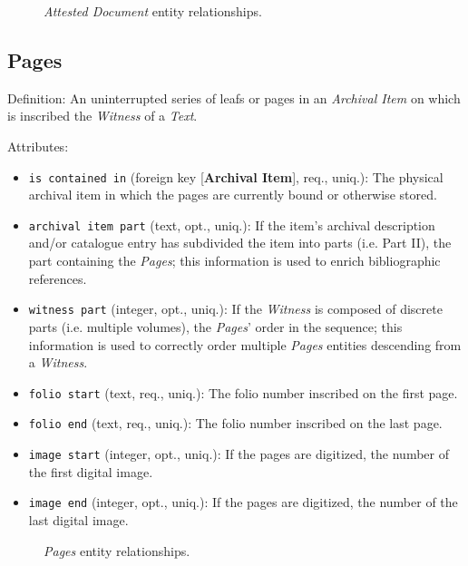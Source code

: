 \begin{figure}[ht]
    \begin{center}
        
    \end{center}
\label{fig:AttestedDocumentER}
\caption{\textit{Attested Document} entity relationships.}
\end{figure}


\subsection{Pages}

Definition: An uninterrupted series of leafs or pages in an \textit{Archival Item} on which is inscribed the \textit{Witness} of a \textit{Text}.

\vspace{1em}
\noindent Attributes:
\begin{itemize}
    \item \texttt{is contained in} (foreign key [\textbf{Archival Item}], req., uniq.): The physical archival item in which the pages are currently bound or otherwise stored.
    \item \texttt{archival item part} (text, opt., uniq.): If the item's archival description and/or catalogue entry has subdivided the item into parts (i.e. Part II), the part containing the \textit{Pages}; this information is used to enrich bibliographic references.
    \item \texttt{witness part} (integer, opt., uniq.): If the \textit{Witness} is composed of discrete parts (i.e. multiple volumes), the \textit{Pages}' order in the sequence; this information is used to correctly order multiple \textit{Pages} entities descending from a \textit{Witness}.
    \item \texttt{folio start} (text, req., uniq.): The folio number inscribed on the first page.
    \item \texttt{folio end} (text, req., uniq.): The folio number inscribed on the last page.
    \item \texttt{image start} (integer, opt., uniq.): If the pages are digitized, the number of the first digital image.
    \item \texttt{image end} (integer, opt., uniq.): If the pages are digitized, the number of the last digital image.
\end{itemize}

\begin{figure}[ht]
    \begin{center}
        
    \end{center}
\label{fig:PagesER}
\caption{\textit{Pages} entity relationships.}
\end{figure}

